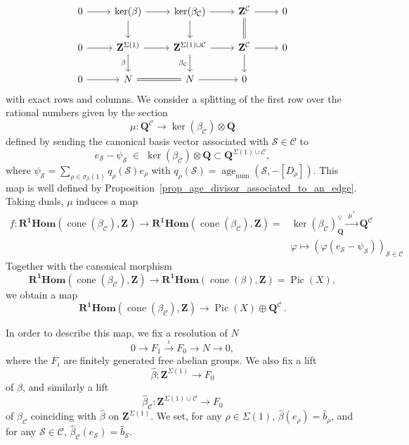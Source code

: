 \documentclass{proc-l}
\newcommand{\Z}{\mathbf{Z}}
\newcommand{\Q}{\mathbf{Q}}
\DeclareMathOperator{\Pic}{Pic}
\DeclareMathOperator{\coneform}{cone}
\DeclareMathOperator{\num}{num}
\DeclareMathOperator{\age}{age}
\newcommand{\stackS}{\mathcal{S}}
\theoremstyle{definition}
\theoremstyle{remark}
\numberwithin{equation}{section}
\begin{document}
\begin{equation}\label{equation_diagram_computation_orbifold_picard_group_appendix}
\begin{tikzcd}
0 \arrow[r] 
& \ker(\beta) \arrow[r] \arrow[d]
& \ker(\beta_{\mathcal{C}}) \arrow[r] \arrow[d]
& \Z^{\mathcal{C}} \arrow[d, equal] \arrow[r]
& 0 \\
0 \arrow[r]
& \Z^{\Sigma(1)} \arrow[r] \arrow[d, "\beta"']
& \Z^{\Sigma(1) \cup \mathcal{C}} \arrow[r] \arrow[d, "\beta_{\mathcal{C}}"']
& \Z^{\mathcal{C}} \arrow[r] \arrow[d]
& 0 \\
0 \arrow[r]
& N \arrow[r, equal]
& N \arrow[r]
& 0
\end{tikzcd}
\end{equation}with exact rows and columns. We consider a splitting of the first row over the rational numbers given by the section
\[
\mu \colon \Q^{\mathcal{C}} \longrightarrow \ker(\beta_{\mathcal{C}})\otimes\Q
\]
defined by sending the canonical basis vector associated with $\stackS \in \mathcal{C}$ to
\[
e_{\stackS} - \psi_{\stackS}
\;\in\;
\ker(\beta_{\mathcal{C}})\otimes\Q
\subset
\Q^{\Sigma(1)\cup\mathcal{C}},
\]
where $\psi_{\stackS} = \sum\limits_{\rho \in \sigma_\stackS(1)} q_{\rho}(\stackS) e_{\rho} $ with $q_{\rho}(\stackS) = \age_{\num}(\stackS,-[D_{\rho}])$. This map is well defined by
Proposition~\ref{prop_age_divisor_associated_to_an_edge}. Taking duals, $\mu$ induces a map
\begin{equation}\label{equation_definition_application_appendix_a_3}
\begin{aligned}
f :
\mathbf{R^1 Hom}(\coneform(\beta_{\mathcal{C}}),\Z)
\rightarrow
\mathbf{R^1 Hom}(\coneform(\beta_{\mathcal{C}}),\Z)
=
&\ker(\beta_{\mathcal{C}})^{\vee}_{\Q}
\xrightarrow{\ \mu^*\ }
\Q^{\mathcal{C}} \\
&\varphi \longmapsto \left( \varphi(e_{\stackS} - \psi_{\stackS}) \right)_{\stackS \in \mathcal{C}}
\end{aligned}
\end{equation}
Together with the canonical morphism
\[
\mathbf{R^1 Hom}(\coneform(\beta_{\mathcal{C}}),\Z)
\rightarrow
\mathbf{R^1 Hom}(\coneform(\beta),\Z)= \Pic(X),
\]
we obtain a map
\begin{equation}\label{equation_definition_morphism_appendix}
\mathbf{R^1 Hom}(\coneform(\beta_{\mathcal{C}}),\Z) \rightarrow \Pic(X) \oplus \Q^{\mathcal{C}} \, .    
\end{equation}

In order to describe this map, we fix a resolution of $N$
\[
0 \rightarrow F_1 \xrightarrow{\iota} F_0 \rightarrow N \rightarrow 0,
\]
where the $F_i$ are finitely generated free abelian groups. We also fix a lift
\[
\widehat{\beta} : \Z^{\Sigma(1)} \rightarrow F_0
\]
of $\beta$, and similarly a lift
\[
\widehat{\beta}_{\mathcal{C}} : \Z^{\Sigma(1)\cup\mathcal{C}} \rightarrow F_0
\]
of $\beta_{\mathcal{C}}$ coinciding with $\widehat{\beta}$ on $\Z^{\Sigma(1)}$. We set, for any $\rho \in \Sigma(1)$, $\widehat{\beta}(e_{\rho}) = \widehat{b}_{\rho}$, and for any $\stackS \in \mathcal{C}$, $\widehat{\beta}_{\mathcal{C}}(e_{\stackS}) = \widehat{b}_{\stackS}$.
\end{document}

